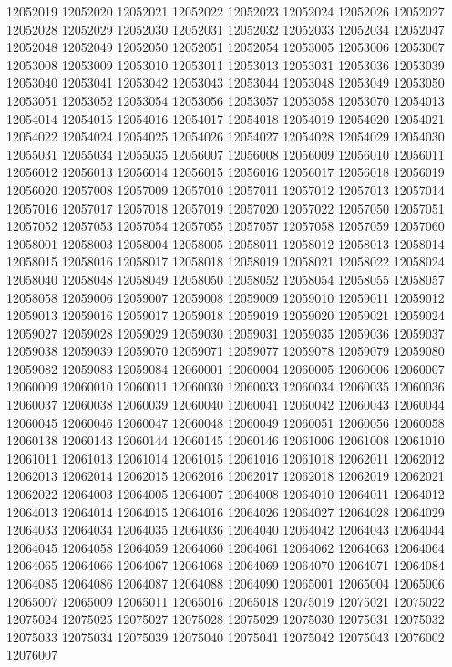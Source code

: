 \documentclass[12pt]{article}
\begin{document}
12052019
12052020
12052021
12052022
12052023
12052024
12052026
12052027
12052028
12052029
12052030
12052031
12052032
12052033
12052034
12052047
12052048
12052049
12052050
12052051
12052054
12053005
12053006
12053007
12053008
12053009
12053010
12053011
12053013
12053031
12053036
12053039
12053040
12053041
12053042
12053043
12053044
12053048
12053049
12053050
12053051
12053052
12053054
12053056
12053057
12053058
12053070
12054013
12054014
12054015
12054016
12054017
12054018
12054019
12054020
12054021
12054022
12054024
12054025
12054026
12054027
12054028
12054029
12054030
12055031
12055034
12055035
12056007
12056008
12056009
12056010
12056011
12056012
12056013
12056014
12056015
12056016
12056017
12056018
12056019
12056020
12057008
12057009
12057010
12057011
12057012
12057013
12057014
12057016
12057017
12057018
12057019
12057020
12057022
12057050
12057051
12057052
12057053
12057054
12057055
12057057
12057058
12057059
12057060
12058001
12058003
12058004
12058005
12058011
12058012
12058013
12058014
12058015
12058016
12058017
12058018
12058019
12058021
12058022
12058024
12058040
12058048
12058049
12058050
12058052
12058054
12058055
12058057
12058058
12059006
12059007
12059008
12059009
12059010
12059011
12059012
12059013
12059016
12059017
12059018
12059019
12059020
12059021
12059024
12059027
12059028
12059029
12059030
12059031
12059035
12059036
12059037
12059038
12059039
12059070
12059071
12059077
12059078
12059079
12059080
12059082
12059083
12059084
12060001
12060004
12060005
12060006
12060007
12060009
12060010
12060011
12060030
12060033
12060034
12060035
12060036
12060037
12060038
12060039
12060040
12060041
12060042
12060043
12060044
12060045
12060046
12060047
12060048
12060049
12060051
12060056
12060058
12060138
12060143
12060144
12060145
12060146
12061006
12061008
12061010
12061011
12061013
12061014
12061015
12061016
12061018
12062011
12062012
12062013
12062014
12062015
12062016
12062017
12062018
12062019
12062021
12062022
12064003
12064005
12064007
12064008
12064010
12064011
12064012
12064013
12064014
12064015
12064016
12064026
12064027
12064028
12064029
12064033
12064034
12064035
12064036
12064040
12064042
12064043
12064044
12064045
12064058
12064059
12064060
12064061
12064062
12064063
12064064
12064065
12064066
12064067
12064068
12064069
12064070
12064071
12064084
12064085
12064086
12064087
12064088
12064090
12065001
12065004
12065006
12065007
12065009
12065011
12065016
12065018
12075019
12075021
12075022
12075024
12075025
12075027
12075028
12075029
12075030
12075031
12075032
12075033
12075034
12075039
12075040
12075041
12075042
12075043
12076002
12076007
\end{document}
